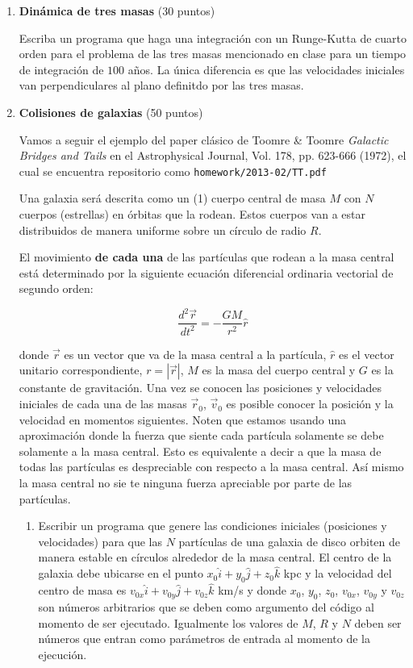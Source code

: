 \documentclass{article}
\begin{document}
\begin{enumerate}
\begin{itemize}
\end{itemize}

\item {\bf Din\'amica de tres masas} (30 puntos)

Escriba un programa que haga una integraci\'on con un Runge-Kutta de
cuarto orden para el problema de las tres masas mencionado en
clase para un tiempo de integraci\'on de $100$ a\~nos. La \'unica
diferencia es que las velocidades iniciales van perpendiculares al
plano definitdo por las tres masas.

\item {\bf Colisiones de galaxias} (50 puntos)

Vamos a seguir el ejemplo  del paper cl\'asico de Toomre \& Toomre
\textit{Galactic Bridges and Tails} en el Astrophysical Journal, Vol. 178,
pp. 623-666 (1972), el cual se encuentra repositorio como
\verb"homework/2013-02/TT.pdf" 

Una galaxia ser\'a descrita como un (1) cuerpo central de masa $M$ con $N$ cuerpos (estrellas) en \'orbitas que la rodean. Estos cuerpos van a estar distribuidos de manera uniforme sobre un c\'irculo de radio $R$.

El movimiento {\bf de cada una} de las part\'iculas que rodean a la masa
central est\'a determinado por la siguiente ecuaci\'on diferencial
ordinaria vectorial de segundo orden: 
 
\begin{equation}
\frac{d^2\vec{r}}{dt^2} = -\frac{GM}{r^2} \hat{r}
\end{equation}

donde $\vec{r}$  es un vector que va de la masa central a la
part\'icula, $\hat{r}$ es el vector unitario correspondiente,
$r=|\vec{r}|$, $M$ es la masa del cuerpo central y $G$ es la constante
de gravitaci\'on.  Una vez se conocen las posiciones y velocidades
iniciales de cada una de las masas $\vec{r}_0$, $\vec{v}_0$ es posible
conocer la posici\'on y la velocidad en momentos siguientes. Noten que
estamos usando una  aproximaci\'on donde la fuerza que siente cada
part\'icula solamente se debe solamente a la masa central. Esto es
equivalente a decir a  que la masa de todas las part\'iculas es
despreciable con respecto a la masa central. As\'i mismo la masa central no sie te ninguna  fuerza apreciable por parte de las part\'iculas. 

\begin{enumerate}
\item Escribir un programa que genere
  las condiciones  iniciales (posiciones y velocidades) para que las
  $N$ part\'iculas de una galaxia de disco orbiten de manera estable
  en c\'irculos alrededor de la masa  central. 
  El centro de la galaxia debe ubicarse en
  el punto $x_{0}\hat{i} + y_{0}\hat{j} + z_{0}\hat{k}$ kpc y la
  velocidad del centro de masa es $v_{0x}\hat{i}+v_{0y}\hat{j} +
  v_{0z}\hat{k}$ km/s y donde $x_{0}$, $y_{0}$, $z_{0}$, $v_{0x}$,
  $v_{0y}$ y $v_{0z}$ son  n\'umeros arbitrarios que se deben como
  argumento del c\'odigo al  momento de ser ejecutado. Igualmente los
  valores de $M$, $R$ y $N$ deben ser n\'umeros que entran como
  par\'ametros de entrada al momento de la ejecuci\'on. 


\end{enumerate}
\end{enumerate}
\end{document}
